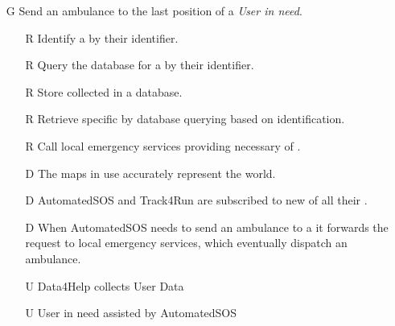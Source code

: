 \documentclass[../../../rasd.tex]{subfiles}
\begin{document}
\begin{itemize}
    \item[G\subs{7}]Send an ambulance to the last position of a \textit{User in need}.
    \begin{itemize}
        \item[R\subs{6}]Identify a  by their identifier.
        \item[R\subs{7}]Query the database for a  by their identifier.
        \item[R\subs{11}]Store collected  in a database.
        \item[R\subs{12}]Retrieve specific  by database querying based on  identification.
        \item[R\subs{37}]Call local emergency services providing necessary  of .
        \\
        \item[D\subs{3}]The maps in use accurately represent the world.
        \item[D\subs{6}]AutomatedSOS and Track4Run are subscribed to new  of all their .
        \item[D\subs{7}]When AutomatedSOS needs to send an ambulance to a  it forwards the request to local emergency services, which eventually dispatch an ambulance.
        \\
        \item[U\subs{5}]Data4Help collects User Data
        \item[U\subs{12}]User in need assisted by AutomatedSOS
    \end{itemize}
\end{itemize}
\end{document}
